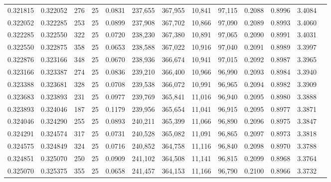 \begin{tabular}{rrrrrrrrrrrrr}
0.321815 & 0.322052 &   276 &  25 &                                     0.0831 & 237,655 & 367,955 &  10,841 &  97,115 & 0.2088 & 0.8996 & 3.4084 \\
0.322052 & 0.322285 &   253 &  25 &                                     0.0899 & 237,908 & 367,702 &  10,866 &  97,090 & 0.2089 & 0.8993 & 3.4060 \\
0.322285 & 0.322550 &   322 &  25 &                                     0.0720 & 238,230 & 367,380 &  10,891 &  97,065 & 0.2090 & 0.8991 & 3.4031 \\
0.322550 & 0.322875 &   358 &  25 &                                     0.0653 & 238,588 & 367,022 &  10,916 &  97,040 & 0.2091 & 0.8989 & 3.3997 \\
0.322876 & 0.323166 &   348 &  25 &                                     0.0670 & 238,936 & 366,674 &  10,941 &  97,015 & 0.2092 & 0.8987 & 3.3965 \\
0.323166 & 0.323387 &   274 &  25 &                                     0.0836 & 239,210 & 366,400 &  10,966 &  96,990 & 0.2093 & 0.8984 & 3.3940 \\
0.323388 & 0.323681 &   328 &  25 &                                     0.0708 & 239,538 & 366,072 &  10,991 &  96,965 & 0.2094 & 0.8982 & 3.3909 \\
0.323683 & 0.323893 &   231 &  25 &                                     0.0977 & 239,769 & 365,841 &  11,016 &  96,940 & 0.2095 & 0.8980 & 3.3888 \\
0.323893 & 0.324046 &   187 &  25 &                                     0.1179 & 239,956 & 365,654 &  11,041 &  96,915 & 0.2095 & 0.8977 & 3.3871 \\
0.324046 & 0.324290 &   255 &  25 &                                     0.0893 & 240,211 & 365,399 &  11,066 &  96,890 & 0.2096 & 0.8975 & 3.3847 \\
0.324291 & 0.324574 &   317 &  25 &                                     0.0731 & 240,528 & 365,082 &  11,091 &  96,865 & 0.2097 & 0.8973 & 3.3818 \\
0.324575 & 0.324849 &   324 &  25 &                                     0.0716 & 240,852 & 364,758 &  11,116 &  96,840 & 0.2098 & 0.8970 & 3.3788 \\
0.324851 & 0.325070 &   250 &  25 &                                     0.0909 & 241,102 & 364,508 &  11,141 &  96,815 & 0.2099 & 0.8968 & 3.3764 \\
0.325070 & 0.325375 &   355 &  25 &                                     0.0658 & 241,457 & 364,153 &  11,166 &  96,790 & 0.2100 & 0.8966 & 3.3732 \\

\end{tabular}
